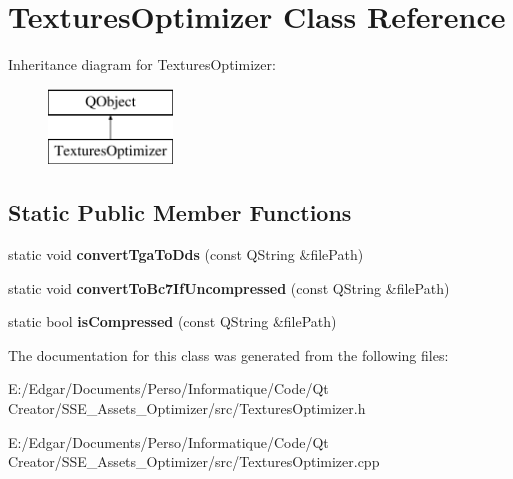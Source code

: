 \hypertarget{class_textures_optimizer}{}\section{Textures\+Optimizer Class Reference}
\label{class_textures_optimizer}
Inheritance diagram for Textures\+Optimizer\+:\begin{figure}[H]
\begin{center}
\leavevmode
\includegraphics[height=2.000000cm]{class_textures_optimizer}
\end{center}
\end{figure}
\subsection*{Static Public Member Functions}
\begin{DoxyCompactItemize}
\item 
\mbox{\label{class_textures_optimizer_ab42908778697c91d5ba42aa3811379c8}} 
static void {\bfseries convert\+Tga\+To\+Dds} (const Q\+String \&file\+Path)
\item 
\mbox{\label{class_textures_optimizer_a2ff348704ba0f5a318a05dd83e207445}} 
static void {\bfseries convert\+To\+Bc7\+If\+Uncompressed} (const Q\+String \&file\+Path)
\item 
\mbox{\label{class_textures_optimizer_aef29087b20f52d93eca17c89c36d5047}} 
static bool {\bfseries is\+Compressed} (const Q\+String \&file\+Path)
\end{DoxyCompactItemize}


The documentation for this class was generated from the following files\+:\begin{DoxyCompactItemize}
\item 
E\+:/\+Edgar/\+Documents/\+Perso/\+Informatique/\+Code/\+Qt Creator/\+S\+S\+E\+\_\+\+Assets\+\_\+\+Optimizer/src/Textures\+Optimizer.\+h\item 
E\+:/\+Edgar/\+Documents/\+Perso/\+Informatique/\+Code/\+Qt Creator/\+S\+S\+E\+\_\+\+Assets\+\_\+\+Optimizer/src/Textures\+Optimizer.\+cpp\end{DoxyCompactItemize}
